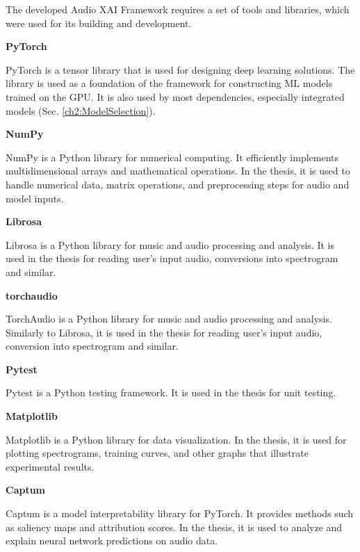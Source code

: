 \documentclass[
    bindingoffset=5mm,  %
    footnoteindent=3mm, %
    hyphenation=true    %
]{src/wut-thesis}
\begin{document}
The developed Audio XAI Framework requires a set of tools and libraries,
which were used for its building and development.

\begin{description}
\item \textbf{PyTorch \cite{PyTorchDoc}}

PyTorch is a tensor library that is used for designing deep learning solutions.
The library is used as a foundation of the framework for constructing ML models trained on the GPU.
It is also used by most dependencies, especially integrated models (Sec. \ref{ch2:ModelSelection}).

\item \textbf{NumPy \cite{NumpyDoc}}

NumPy is a Python library for numerical computing. It efficiently implements multidimensional arrays
and mathematical operations. In the thesis, it is used to handle numerical data, matrix operations,
and preprocessing steps for audio and model inputs.

\item \textbf{Librosa \cite{LibrosaDoc}}

Librosa is a Python library for music and audio processing and analysis. It is used in the
thesis for reading user's input audio, conversions into spectrogram and similar.

\item \textbf{torchaudio \cite{TorchAudioDoc}}

TorchAudio is a Python library for music and audio processing and analysis.
Similarly to Librosa, it is used in the thesis for reading user's input audio, conversion
into spectrogram and similar.

\item \textbf{Pytest \cite{PytestDoc}}

Pytest is a Python testing framework. It is used in the thesis for unit testing.

\item \textbf{Matplotlib \cite{MatplotlibDoc}}

Matplotlib is a Python library for data visualization. In the thesis,
it is used for plotting spectrograms, training curves, and other graphs
that illustrate experimental results.

\item \textbf{Captum \cite{CaptumDoc}}

Captum is a model interpretability library for PyTorch. It provides methods such as saliency maps
and attribution scores. In the thesis, it is used to analyze and explain neural network 
predictions on audio data.


\end{description}
\end{document}

